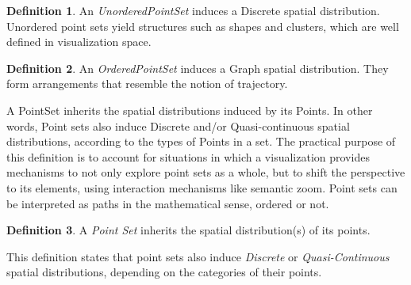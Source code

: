 \documentclass[]{interact}
\theoremstyle{plain}%
\theoremstyle{definition}
\theoremstyle{remark}
\theoremstyle{definition}
\newtheorem{defn}{Definition}[section]
\begin{document}

\begin{defn}
An \emph{UnorderedPointSet} induces a Discrete spatial distribution. Unordered point sets yield structures such as shapes and clusters, which are well defined in visualization space.
\end{defn}

\begin{defn}
An \emph{OrderedPointSet} induces a Graph spatial distribution. They form arrangements that resemble the notion of trajectory.
\end{defn}

A PointSet inherits the spatial distributions induced by its Points. In other words, Point sets also induce Discrete and/or Quasi-continuous spatial distributions, according to the types of Points in a set. The practical purpose of this definition is to account for situations in which a visualization provides mechanisms to not only explore point sets as a whole, but to shift the perspective to its elements, using interaction mechanisms like semantic zoom. Point sets can be interpreted as paths in the mathematical sense, ordered or not. 


\begin{defn}
A \emph{Point Set} inherits the spatial distribution(s) of its points.
\end{defn}

This definition states that point sets also induce \emph{Discrete} or \emph{Quasi-Continuous} spatial distributions, depending on the categories of their points.
%
%
%
\end{document}
